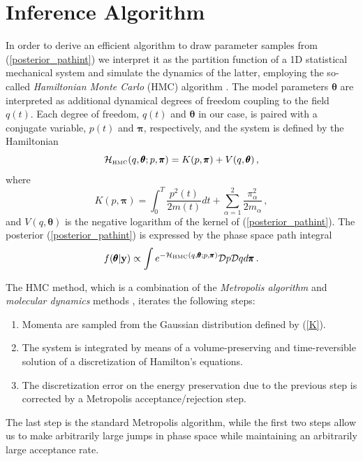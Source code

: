 \documentclass[12pt,a4paper,final]{iopart}
\newcommand{\bt}{\pmb\theta}
\newcommand{\vc}[1]{{\bf #1 }}
\begin{document}


\section{Inference Algorithm}

In order to derive an efficient algorithm to draw parameter samples from (\ref{posterior_pathint}) we interpret it as the partition function of a 1D statistical mechanical system and simulate the dynamics of the latter, employing the so-called {\em Hamiltonian Monte Carlo} (HMC) algorithm \cite{duane_1987_HMC}.
The model parameters $\bt$ are interpreted as additional dynamical degrees of freedom coupling to the field $q(t)$.
Each degree of freedom, $q(t)$ and $\bt$ in our case, is paired with a conjugate variable, $p(t)$ and ${\pmb\pi}$, respectively, and the system is defined by the  Hamiltonian
\begin{equation}\label{Hamiltonian}
    \mathcal{H}_{\mbox{\tiny HMC}}(q,\bt; p,{\pmb\pi})
    =
    K( p,{\pmb\pi}) + V( q,\bt)\,,
\end{equation}
where
\begin{equation}\label{K}
   K( p,{\pmb\pi})
   =
   \int_0^T \frac{ p^2(t)}{2m(t)}dt
   + \sum_{\alpha=1}^2\frac{\pi_\alpha^2}{2m_\alpha}\,,
\end{equation}
and $V( q,\bt)$ is the negative logarithm of the kernel of (\ref{posterior_pathint}).
The posterior (\ref{posterior_pathint}) is expressed by the phase space path integral
\begin{equation}\label{phaseSpacePathInt}
    f(\bt | \vc y)
  \propto
  \int
  e^{-\mathcal {H}_{\mbox{\tiny HMC}}(q,\bt; p,{\pmb\pi})}
  {\mathcal Dp}
   {\mathcal Dq}
   d{\pmb\pi}
  \,.
\end{equation}

The HMC method, which is a combination of the {\em Metropolis algorithm} \cite{metropolis_1953_MRT2} and {\em molecular dynamics} methods \cite{Alder_1959_MD, Rahman_1964_MD}, iterates the following steps:
\begin{enumerate}
  \item
  Momenta are sampled from the Gaussian distribution defined by (\ref{K}).
  \item
  The system is integrated by means of a volume-preserving and time-reversible solution of a discretization of Hamilton's equations.
  \item
  The discretization error on the energy preservation due to the previous step is corrected by a Metropolis acceptance/rejection step.
\end{enumerate}
The last step is the standard Metropolis algorithm, while the first two steps allow us to make arbitrarily large jumps in phase space while maintaining an arbitrarily large acceptance rate.
\end{document}
